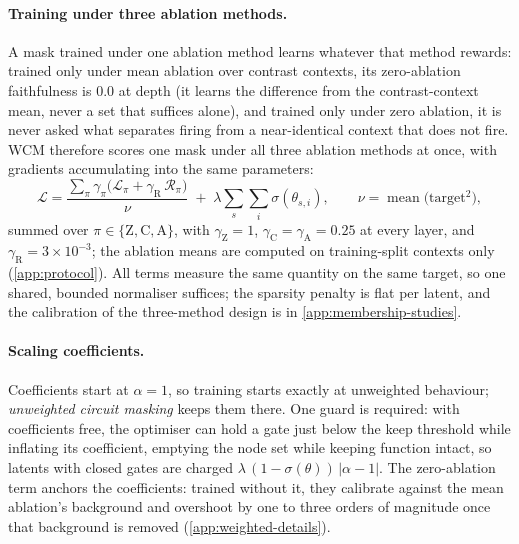 \documentclass[10pt]{article}
\begin{document}
\paragraph{Training under three ablation methods.}
A mask trained under one ablation method learns whatever that method rewards: trained only under mean ablation over contrast contexts, its zero-ablation faithfulness is $0.0$ at depth (it learns the difference from the contrast-context mean, never a set that suffices alone), and trained only under zero ablation, it is never asked what separates firing from a near-identical context that does not fire.
WCM therefore scores one mask under all three ablation methods at once, with gradients accumulating into the same parameters:
\[
    \mathcal{L}
    = \frac{\sum_{\pi} \gamma_{\pi} \bigl(\mathcal{L}_{\pi} + \gamma_{\mathrm{R}}\, \mathcal{R}_{\pi}\bigr)}{\nu}
    \;+\; \lambda \sum_{s}\sum_{i} \sigma(\theta_{s,i}),
    \qquad
    \nu = \operatorname{mean}\bigl(\text{target}^2\bigr),
\]
summed over $\pi \in \{\mathrm{Z}, \mathrm{C}, \mathrm{A}\}$, with $\gamma_{\mathrm{Z}} = 1$, $\gamma_{\mathrm{C}} = \gamma_{\mathrm{A}} = 0.25$ at every layer, and $\gamma_{\mathrm{R}} = 3 \times 10^{-3}$; the ablation means are computed on training-split contexts only (\cref{app:protocol}).
All terms measure the same quantity on the same target, so one shared, bounded normaliser suffices; the sparsity penalty is flat per latent, and the calibration of the three-method design is in \cref{app:membership-studies}.

\paragraph{Scaling coefficients.}
Coefficients start at $\alpha = 1$, so training starts exactly at unweighted behaviour; \emph{unweighted circuit masking} keeps them there.
One guard is required: with coefficients free, the optimiser can hold a gate just below the keep threshold while inflating its coefficient, emptying the node set while keeping function intact, so latents with closed gates are charged $\lambda\,(1 - \sigma(\theta))\,|\alpha - 1|$.
The zero-ablation term anchors the coefficients: trained without it, they calibrate against the mean ablation's background and overshoot by one to three orders of magnitude once that background is removed (\cref{app:weighted-details}).
\end{document}
